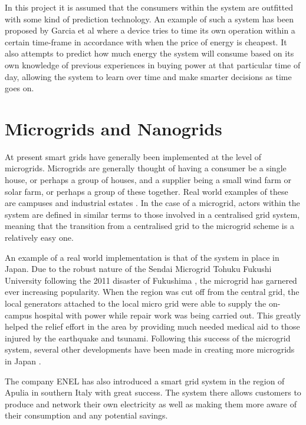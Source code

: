 \documentclass[a4paper, notitlepage]{report}
\begin{document}
In this project it is assumed that the consumers within the system are outfitted
with some kind of prediction technology. An example of such a system has been
proposed by Garcia et al \cite{mohsenian2010optimal} where a device tries to time
its own operation within a certain time-frame in accordance with when the price
of energy is cheapest. It also attempts to predict how much energy the system
will consume based on its own knowledge of previous experiences in buying power
at that particular time of day, allowing the system to learn over time and make
smarter decisions as time goes on. 
\section{Microgrids and Nanogrids}
\label{sec:orga114058}
At present smart grids have generally been implemented at the level of
microgrids. Microgrids are generally thought of having a consumer be a single
house, or perhaps a group of houses, and a supplier being a small wind farm or
solar farm, or perhaps a group of these together. Real world examples of these
are campuses and industrial estates \cite{markvart2006microgrids}. In the case of
a microgrid, actors within the system are defined in similar terms to those
involved in a centralised grid system, meaning that the transition from a
centralised grid to the microgrid scheme is a relatively easy one.

An example of a real world implementation is that of the system in place in
Japan. Due to the robust nature of the Sendai Microgrid Tohuku Fukushi
University following the 2011 disaster of Fukushima \cite{hirose2013sendai}, the
microgrid has garnered ever increasing popularity. When the region was cut off
from the central grid, the local generators attached to the local micro grid
were able to supply the on-campus hospital with power while repair work was
being carried out. This greatly helped the relief effort in the area by
providing much needed medical aid to those injured by the earthquake and
tsunami. Following this success of the microgrid system, several other
developments have been made in creating more microgrids in Japan
\cite{japan_microgrids}. 

The company ENEL has also introduced a smart grid system in the region of Apulia
in southern Italy \cite{sapienza2013enel} with great success. The system there
allows customers to produce and network their own electricity as well as making
them more aware of their consumption and any potential savings.
\end{document}
